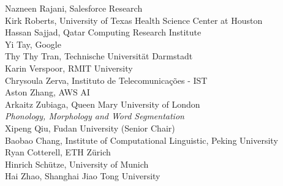 \hspace*{0.2in} Nazneen Rajani, Salesforce Research\\
\hspace*{0.2in} Kirk Roberts, University of Texas Health Science Center at Houston\\
\hspace*{0.2in} Hassan Sajjad, Qatar Computing Research Institute\\
\hspace*{0.2in} Yi Tay, Google\\
\hspace*{0.2in} Thy Thy Tran, Technische Universität Darmstadt\\
\hspace*{0.2in} Karin Verspoor, RMIT University\\
\hspace*{0.2in} Chrysoula Zerva, Instituto de Telecomunicações - IST\\
\hspace*{0.2in} Aston Zhang, AWS AI\\
\hspace*{0.2in} Arkaitz Zubiaga, Queen Mary University of London\\

\emph{Phonology, Morphology and Word Segmentation} \\
\hspace*{0.2in} Xipeng Qiu, Fudan University (Senior Chair)\\
\hspace*{0.2in} Baobao Chang, Institute of Computational Linguistic, Peking University\\
\hspace*{0.2in} Ryan Cotterell, ETH Zürich\\
\hspace*{0.2in} Hinrich Schütze, University of Munich\\
\hspace*{0.2in} Hai Zhao, Shanghai Jiao Tong University\\

